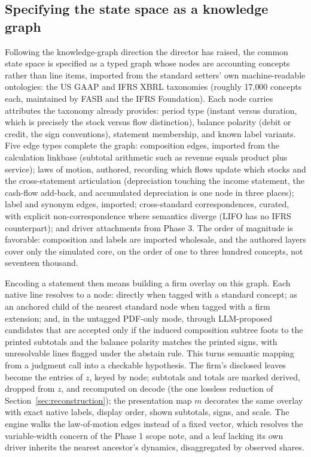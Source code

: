 \documentclass[11pt]{article}
\begin{document}
\subsection{Specifying the state space as a knowledge graph}
\label{sec:kg}
Following the knowledge-graph direction the director has raised, the common state space is specified as a typed graph whose nodes are accounting concepts rather than line items, imported from the standard setters' own machine-readable ontologies: the US GAAP and IFRS XBRL taxonomies (roughly 17{,}000 concepts each, maintained by FASB and the IFRS Foundation). Each node carries attributes the taxonomy already provides: period type (instant versus duration, which is precisely the stock versus flow distinction), balance polarity (debit or credit, the sign conventions), statement membership, and known label variants. Five edge types complete the graph: composition edges, imported from the calculation linkbase (subtotal arithmetic such as revenue equals product plus service); laws of motion, authored, recording which flows update which stocks and the cross-statement articulation (depreciation touching the income statement, the cash-flow add-back, and accumulated depreciation is one node in three places); label and synonym edges, imported; cross-standard correspondences, curated, with explicit non-correspondence where semantics diverge (LIFO has no IFRS counterpart); and driver attachments from Phase 3. The order of magnitude is favorable: composition and labels are imported wholesale, and the authored layers cover only the simulated core, on the order of one to three hundred concepts, not seventeen thousand.

Encoding a statement then means building a firm overlay on this graph. Each native line resolves to a node: directly when tagged with a standard concept; as an anchored child of the nearest standard node when tagged with a firm extension; and, in the untagged PDF-only mode, through LLM-proposed candidates that are accepted only if the induced composition subtree foots to the printed subtotals and the balance polarity matches the printed signs, with unresolvable lines flagged under the abstain rule. This turns semantic mapping from a judgment call into a checkable hypothesis. The firm's disclosed leaves become the entries of $z$, keyed by node; subtotals and totals are marked derived, dropped from $z$, and recomputed on decode (the one lossless reduction of Section~\ref{sec:reconstruction}); the presentation map $m$ decorates the same overlay with exact native labels, display order, shown subtotals, signs, and scale. The engine walks the law-of-motion edges instead of a fixed vector, which resolves the variable-width concern of the Phase 1 scope note, and a leaf lacking its own driver inherits the nearest ancestor's dynamics, disaggregated by observed shares.
\end{document}
